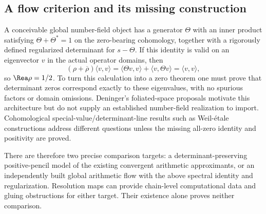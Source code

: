 \subsection{A flow criterion and its missing construction}
A conceivable global number-field object has a generator $\Theta$ with an inner product satisfying $\Theta+\Theta^*=1$ on the zero-bearing cohomology, together with a rigorously defined regularized determinant for $s-\Theta$. If this identity is valid on an eigenvector $v$ in the actual operator domains, then
\[
 (\rho+\overline\rho)\langle v,v\rangle
 =\langle\Theta v,v\rangle+\langle v,\Theta v\rangle
 =\langle v,v\rangle,
\]
so $\Rea\rho=1/2$. To turn this calculation into a zero theorem one must prove that determinant zeros correspond exactly to these eigenvalues, with no spurious factors or domain omissions. Deninger's foliated-space proposals \cite{Deninger} motivate this architecture but do not supply an established number-field realization to import. Cohomological special-value/determinant-line results such as Weil-\'etale constructions address different questions unless the missing all-zero identity and positivity are proved.

There are therefore two precise comparison targets: a determinant-preserving positive-pencil model of the existing convergent arithmetic approximants, or an independently built global arithmetic flow with the above spectral identity and regularization. Resolution maps can provide chain-level computational data and gluing obstructions for either target. Their existence alone proves neither comparison.

